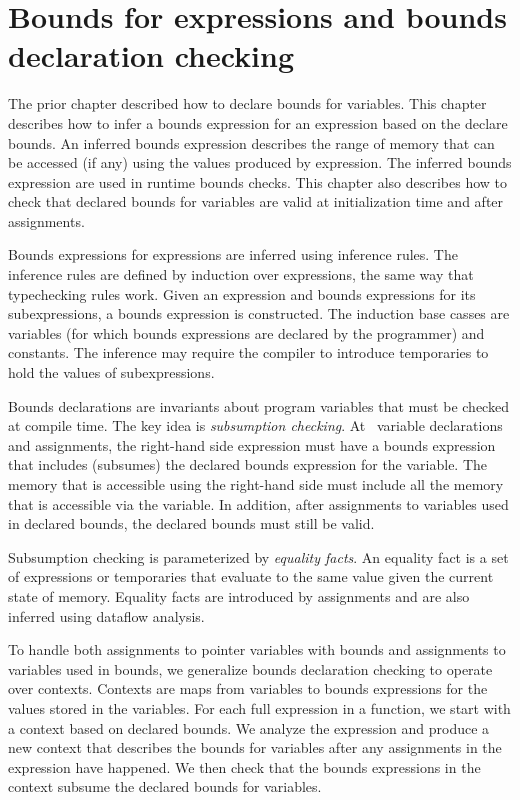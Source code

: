 
\chapter{Bounds for expressions and bounds declaration checking}
\label{chapter:checking-bounds}

The prior chapter described how to declare bounds for variables.
This chapter describes how to infer a bounds expression for 
an expression based on the declare bounds.  An inferred bounds expression
describes the range of memory that can be accessed (if any) using 
the values produced by expression.  The inferred bounds expression
are used in runtime bounds checks.   This chapter also describes how to
 check that  declared bounds for variables are valid at initialization
 time and after assignments.

Bounds expressions for expressions are inferred using inference
rules.  The inference rules are defined by induction over expressions, 
the same way that typechecking rules work.  Given an expression
and bounds expressions for its subexpressions, a bounds expression
is constructed.  The induction base casses are variables (for which
bounds expressions are declared by the programmer) and constants.
The inference may require the compiler to introduce temporaries to
hold the values of subexpressions.

Bounds declarations are invariants about program variables
that must be checked at compile time.  The key idea is {\em subsumption checking}.
At \arrayptr\ variable declarations and assignments, 
the right-hand side expression must have a bounds expression that includes (subsumes) 
the declared bounds  expression for the variable.  The memory that is accessible using
the right-hand side must include all the memory that is accessible via the variable.
In addition, after assignments to variables used in declared bounds, the
declared bounds must still be valid.

Subsumption checking is parameterized by {\it equality facts}.
An equality fact is a set of expressions or temporaries that evaluate 
to the same value given the current state of memory.  
Equality facts are introduced by assignments and are also inferred using dataflow analysis.

To handle both assignments to pointer variables with bounds and assignments
to variables used in bounds, we generalize bounds declaration
checking to operate over contexts.  Contexts are maps from variables
to bounds expressions for the values stored in the variables.  For
each full expression in a function, we start with a context based
on declared bounds.  We analyze the expression and produce a new
context that describes the bounds for variables after any assignments
in the expression have happened.  We then check that the bounds
expressions in the context subsume the declared bounds for variables.

